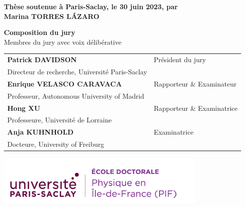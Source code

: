 \documentclass[french,12pt,a4paper]{book}
\begin{document}
\begin{titlepage}
\textbf{Thèse soutenue à Paris-Saclay, le 30 juin 2023, par}\\
\bigskip
\Large {\color{Prune} \textbf{Marina TORRES LÁZARO}} %

\vspace{\fill} %

\bigskip

\flushleft
\small {\color{Prune} \textbf{Composition du jury}}\\
{\color{Prune} \scriptsize {Membres du jury avec voix délibérative}} \\
\vspace{2mm}
\scriptsize
\begin{tabular}{|p{7cm}l}
\arrayrulecolor{Prune}
\textbf{Patrick DAVIDSON} &  Président du jury \\
Directeur de recherche, Université Paris-Saclay   &   \\
\textbf{Enrique VELASCO CARAVACA} &  Rapporteur \& Examinateur \\
Professeur, Autonomous University of Madrid  &   \\
\textbf{Hong XU} &  Rapporteur \& Examinatrice \\
Professeure, Université de Lorraine   &   \\
\textbf{Anja KUHNHOLD} &  Examinatrice \\
Docteure, University of Freiburg   &   \\
 

\end{tabular} 

\end{titlepage}


\thispagestyle{empty}
\selectfont

\lhead{}
\rhead{}
\rfoot{}
\cfoot{}
\lfoot{}

\noindent 
\includegraphics[height=2.45cm]{logo_usp_PIF.png}
\vspace{1cm}
\selectfont
\end{document}
